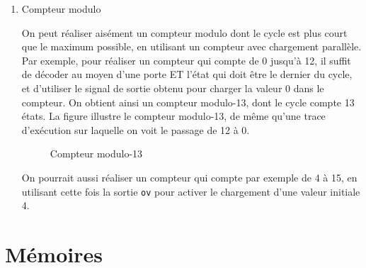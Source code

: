 \documentclass[letter, oneside]{book}
\begin{document}
\begin{enumerate}
La trace d'exécution de la figure \ref{fig:orgcc2675c}
montre le comptage de 4 jusqu'à 15 et retour à 0. On voit le signal
\texttt{ov} s'activer sur 15. 

\begin{figure}[htbp]
\centering

\caption{\label{fig:org5329fb5}Compteur à chargement parallèle}
\end{figure}

\begin{figure}[htbp]
\centering

\caption{\label{fig:orgcc2675c}Trace d'exécution, de 0 à 15}
\end{figure}

La trace de la figure suivante montre le compteur qui
passe de 0 à 5, puis un chargement parallèle de la valeur 12.

\begin{figure}[htbp]
\centering

\caption{\label{fig:org4e1a1c0}Trace d'exécution, de 0 à 5 et chargement de 12}
\end{figure}

\item Compteur modulo
\label{sec:orgaf7f818}

On peut réaliser aisément un compteur modulo dont le cycle est plus
court que le maximum possible, en utilisant un compteur avec
chargement parallèle.  Par exemple, pour réaliser un compteur qui
compte de 0 jusqu'à 12, il suffit de décoder au moyen d'une porte ET
l'état qui doit être le dernier du cycle, et d'utiliser le signal de
sortie obtenu pour charger la valeur 0 dans le compteur. On obtient
ainsi un compteur modulo-13, dont le cycle compte 13 états.  La figure
illustre le compteur modulo-13, de même qu'une trace d'exécution sur
laquelle on voit le passage de 12 à 0.

\begin{figure}[htbp]
\centering

\caption{\label{fig:orgc1d798a}Compteur modulo-13}
\end{figure}

On pourrait aussi réaliser un compteur qui compte par exemple de 4 à
15, en utilisant cette fois la sortie \texttt{ov} pour activer le chargement
d'une valeur initiale 4.
\end{enumerate}

\chapter{Mémoires}
\label{sec:org25ebcf4}
\end{document}
